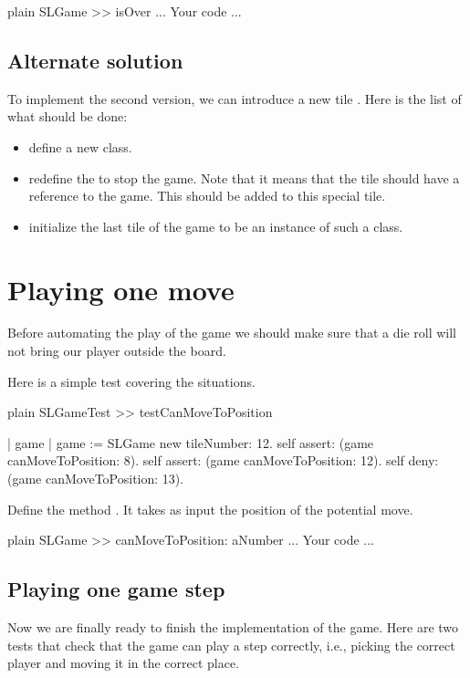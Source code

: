 \documentclass[10pt,twoside,english]{_support/latex/sbabook/sbabook}
\begin{document}
\begin{displaycode}{plain}
SLGame >> isOver
	... Your code ...
\end{displaycode}
\subsection{Alternate solution}
To implement the second version, we can introduce a new tile .
Here is the list of what should be done:

\begin{itemize}
\item define a new class.
\item redefine the  to stop the game. Note that it means that the tile should have a reference to the game. This should be added to this special tile.
\item initialize the last tile of the game to be an instance of such a class.
\end{itemize}
\section{Playing one move}
Before automating the play of the game we should make sure that a die roll will not bring our player outside the board.

Here is a simple test covering the situations.

\begin{displaycode}{plain}
SLGameTest >> testCanMoveToPosition
	
	| game |
	game := SLGame new tileNumber: 12.
	self assert: (game canMoveToPosition: 8).
	self assert: (game canMoveToPosition: 12).
	self deny: (game canMoveToPosition: 13).
\end{displaycode}

Define the method . It takes as input the position of the potential move. 

\begin{displaycode}{plain}
SLGame >> canMoveToPosition: aNumber
	... Your code ...
\end{displaycode}
\subsection{Playing one game step}
Now we are finally ready to finish the implementation of the game. Here are two tests that check that the game can play a step correctly, i.e., picking the correct player and moving it 
in the correct place. 
\end{document}
